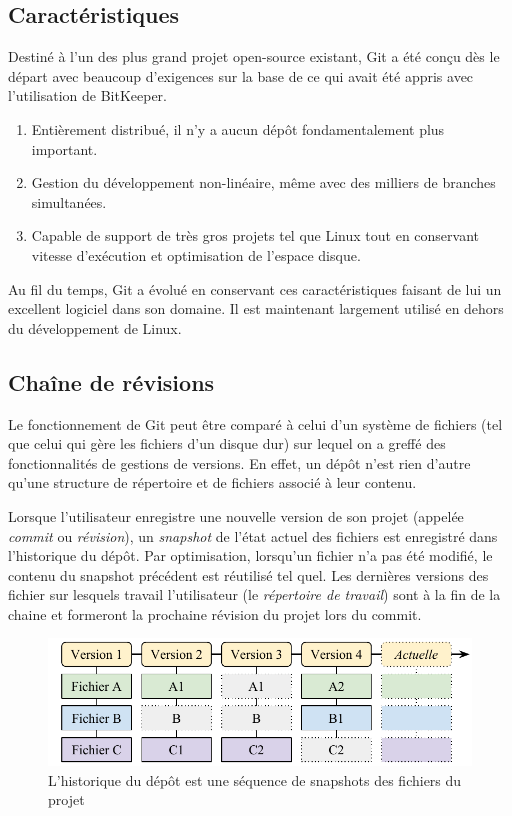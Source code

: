 \documentclass[11pt,a4paper]{article}
\begin{document}
\subsection{Caractéristiques}

Destiné à l'un des plus grand projet open-source existant, Git a été conçu dès le départ avec beaucoup d'exigences sur la base de ce qui avait été appris avec l'utilisation de BitKeeper.

\begin{enumerate}
	\item {Entièrement distribué}, 
	il n'y a aucun dépôt fondamentalement plus important.
	
	\item {Gestion du développement non-linéaire},
	même avec des milliers de branches simultanées.
	
	\item {Capable de support de très gros projets}
	tel que Linux tout en conservant vitesse d'exécution et optimisation de l'espace disque.
\end{enumerate}

Au fil du temps, Git a évolué en conservant ces caractéristiques faisant de lui un excellent logiciel dans son domaine.
Il est maintenant largement utilisé en dehors du développement de Linux.

\subsection{Chaîne de révisions}

Le fonctionnement de Git peut être comparé à celui d'un système de fichiers (tel que celui qui gère les fichiers d'un disque dur) sur lequel on a greffé des fonctionnalités de gestions de versions.
En effet, un dépôt n'est rien d'autre qu'une structure de répertoire et de fichiers associé à leur contenu.

Lorsque l'utilisateur enregistre une nouvelle version de son projet (appelée \textit{commit} ou \textit{révision}), un \textit{snapshot} de l'état actuel des fichiers est enregistré dans l'historique du dépôt.
Par optimisation, lorsqu'un fichier n'a pas été modifié, le contenu du snapshot précédent est réutilisé tel quel. Les dernières versions des fichier sur lesquels travail l'utilisateur (le \textit{répertoire de travail}) sont à la fin de la chaine et formeront la prochaine révision du projet lors du commit.

\begin{figure}[ht]
\begin{center}
\includegraphics[width=12cm]{img_snapshots}
\caption{L'historique du dépôt est une séquence de snapshots des fichiers du projet}
\end{center}
\end{figure}
\end{document}
